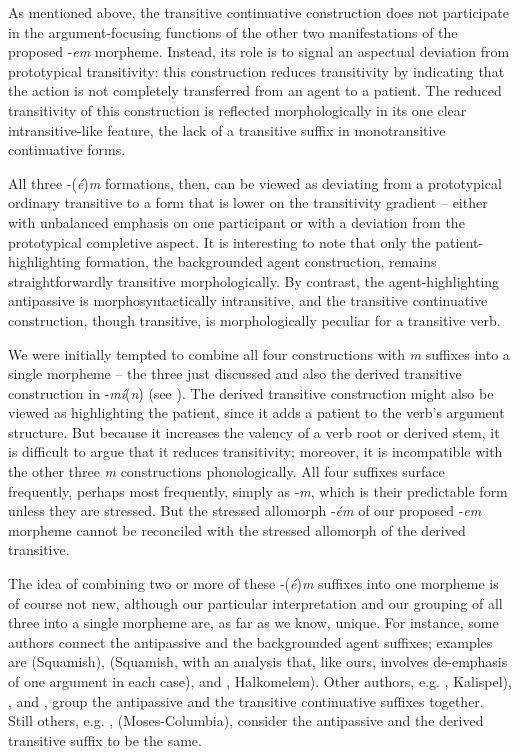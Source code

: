 \documentclass[output=paper,colorlinks,citecolor=brown]{langscibook}
\begin{document}
As mentioned above, the transitive continuative construction does not
participate in the argument-focusing functions of the other two
manifestations of the proposed -\emph{em} morpheme.  Instead, its
role is to signal an aspectual deviation from prototypical
transitivity: this construction reduces transitivity by indicating
that the action is not completely transferred from an agent to a
patient.  The reduced transitivity of this construction is reflected
morphologically in its one clear intransitive-like feature, the lack
of a transitive suffix in monotransitive continuative forms.


All three -(\emph{\'e})\emph{m}  formations, then, can be viewed as
 deviating from a prototypical ordinary transitive to a form that is
 lower on the transitivity gradient -- either with unbalanced emphasis
 on one participant or with a deviation from the prototypical
 completive aspect.  It is interesting to note that only the
 patient-highlighting formation, the backgrounded agent construction,
 remains straightforwardly transitive morphologically.  By contrast,
 the agent-highlighting antipassive is morphosyntactically
 intransitive, and the transitive continuative construction, though
 transitive, is morphologically peculiar for a transitive verb.


We were initially tempted to combine all four constructions with
\emph{m} suffixes into a single morpheme -- the three just discussed
and also the derived transitive construction in -\emph{m\'i}(\emph{n})
(see \citealt{S.Thomason&Everett:1993}).  The derived transitive
construction might also be viewed as highlighting the patient, since
it adds a patient to the verb's argument structure.  But because it
increases the valency of a verb root or derived stem, it is difficult
to argue that it reduces transitivity; moreover, it is incompatible
with the other three \emph{m} constructions phonologically.  All four
suffixes surface frequently, perhaps most frequently, simply as
-\emph{m}, which is their predictable form unless they are stressed.
But the stressed allomorph -\emph{\'em} of our proposed -\emph{em}
morpheme cannot be reconciled with the stressed allomorph of the
derived transitive.

The idea of combining two or more of these -(\emph{\'e})\emph{m}
 suffixes into one morpheme is of course not new, although our
 particular interpretation and our grouping of all three into a
 single morpheme are, as far as we know, unique.  For instance, some
 authors connect the antipassive and the backgrounded agent suffixes;
 examples are \citet{Kuipers:1967} (Squamish), \citet{Darnell:1990}
 (Squamish, with an analysis that, like ours, involves de-emphasis of
 one argument in each case), and \citet[185]{Gerdts:1989},
 Halkomelem).  Other authors, e.g. \citet[32]{Vogt:1940},
 Kalispel), \citet[158--59]{Newman:1980}, and
 \citet[294]{Kroeber:1991}, group the antipassive and the
 transitive continuative suffixes together.  Still others,
 e.g. \citet[105]{Kinkade:1981}, (Moses-Columbia), consider the
 antipassive and the derived transitive suffix to be the same.
\end{document}
